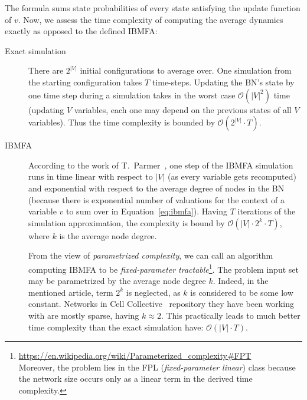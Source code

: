 \documentclass[
	digital, oneside, nosansbold, nocolorbold, nolot, nolof
]{fithesis4}
\theoremstyle{definition}
\theoremstyle{definition}
\begin{document}
The formula sums state probabilities of every state satisfying the update
function of $v$. Now, we assess the time complexity of computing the average
dynamics exactly as opposed to the defined IBMFA:
\begin{description}
    \item[Exact simulation] There are $2^{|V|}$ initial configurations to
        average over. One simulation from the starting configuration
        takes $T$ time-steps.
        Updating the BN's state by one time step during a simulation takes in
        the worst case $\mathcal{O}(|V|^2)$ time (updating $V$ variables, each
        one may depend on the previous states of all $V$ variables). Thus the
        time complexity is bounded by $\mathcal{O}(2^{|V|} \cdot T)$.
    \item[IBMFA] According to the work of T.~Parmer~\cite{infl_max_BN},
        one step of the IBMFA simulation runs in time linear with respect to
        $|V|$ (as every variable gets recomputed) and exponential with respect
        to the average degree of nodes in the BN (because there is exponential
        number of valuations for the context of a variable $v$ to sum over
        in Equation~\ref{eq:ibmfa}). Having $T$ iterations of the simulation
        approximation, the complexity is bound by $\mathcal{O}(|V| \cdot 2^k
        \cdot T)$, where $k$ is the average node degree.

        From the view of \emph{parametrized complexity}, we can call an
        algorithm computing IBMFA to be \emph{fixed-parameter
        tractable}\footnote{\url{
        https://en.wikipedia.org/wiki/Parameterized_complexity\#FPT}\\Moreover,
        the problem lies in the FPL (\emph{fixed-parameter linear}) class
        because the network size occurs only as a linear term in the
        derived time complexity.}.  The problem input set may be parametrized
        by the average node degree $k$.  Indeed, in the mentioned article, term
        $2^k$ is neglected, as $k$ is considered to be some low constant.
        Networks in Cell Collective~\cite{cell_collective} repository they have
        been working with are mostly sparse, having $k \approx 2$. This
        practically leads to much better time complexity than the exact
        simulation have: $\mathcal{O}(|V| \cdot T)$.
\end{description}
\end{document}
